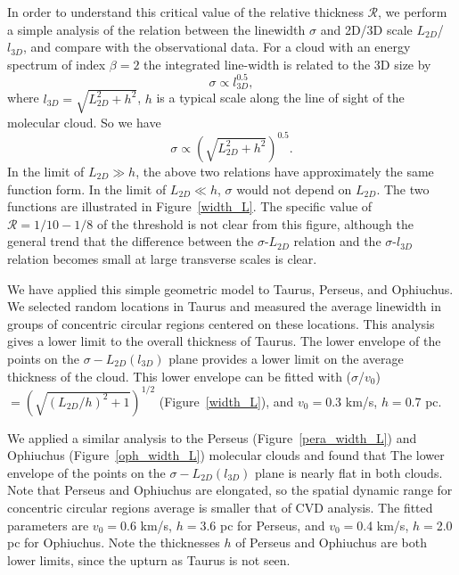 \documentclass[iop,revtex4]{emulateapj}
\begin{document}
In order to understand this critical value of the relative thickness $\mathcal{R}$, we perform a simple analysis of the relation between the linewidth $\sigma$ and 2D/3D scale $L_{2D}$/$l_{3D}$, and compare with the observational data. For a cloud with an energy spectrum of index $\beta=2$ the integrated line-width is related to the 3D size by
\begin{equation}
\sigma\propto l_{3D}^{0.5},
\label{CVD_3D}
\end{equation}
where $l_{3D}=\sqrt{L_{2D}^2+h^2}$, $h$ is a typical scale along the line of sight of the molecular cloud. So we have
\begin{equation}
\sigma\propto \left(\sqrt{L_{2D}^2+h^2}\right)^{0.5}.
\label{CVD_2D}
\end{equation}
In the limit of $L_{2D}\gg h$, the above two relations have approximately the same function form. In the limit of $L_{2D}\ll h$, $\sigma$ would not depend on $L_{2D}$. The two functions are illustrated in Figure~\ref{width_L}. The specific value of $\mathcal{R}=1/10-1/8$ of the threshold is not clear from this figure, although the general trend that the difference between the $\sigma$-$L_{2D}$ relation and the $\sigma$-$l_{3D}$ relation becomes small at large transverse scales is clear.


We have applied this simple geometric model to Taurus, Perseus, and Ophiuchus. We selected random locations in Taurus and measured the average linewidth in groups of concentric circular regions centered on these locations. This analysis gives a lower limit to the overall thickness of Taurus. The lower envelope of the points on the $\sigma-L_{2D}(l_{3D})$ plane provides a lower limit on the average thickness of the cloud. This lower envelope can be fitted with ($\sigma$/$v_0$)$=\left(\sqrt{(L_{2D}/h)^2+1}\right)^{1/2}$ (Figure~\ref{width_L}), and $v_0=$0.3 km/s, $h=$0.7 pc.


We applied a similar analysis to the Perseus (Figure~\ref{pera_width_L}) and Ophiuchus (Figure~\ref{oph_width_L}) molecular clouds and found that The lower envelope of the points on the $\sigma-L_{2D}(l_{3D})$ plane is nearly flat in both clouds. Note that Perseus and Ophiuchus are elongated, so the spatial dynamic range for concentric circular regions average is smaller that of CVD analysis. The fitted parameters are $v_0=$0.6 km/s, $h=$3.6 pc for Perseus, and $v_0=$0.4 km/s, $h=$2.0 pc for Ophiuchus. Note the thicknesses $h$ of Perseus and Ophiuchus are both lower limits, since the upturn as Taurus is not seen.
\end{document}
